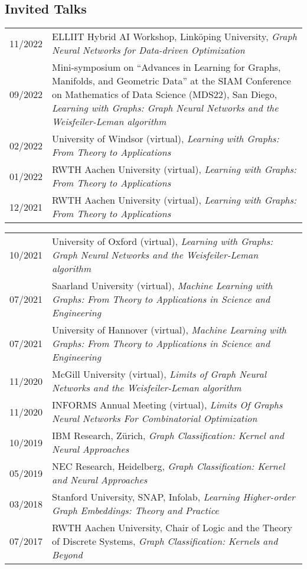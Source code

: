 \documentclass[11pt, a4paper, DIV=12]{scrartcl}
\begin{document}
\subsection*{Invited Talks}
\begin{tabular}{p{2.1cm}p{12.0cm}}
	
11/2022& ELLIIT Hybrid AI Workshop, Linköping University, \emph{Graph Neural Networks for Data-driven Optimization} \\
09/2022& Mini-symposium on ``Advances in Learning for Graphs, Manifolds, and Geometric Data'' at the SIAM Conference on Mathematics of Data Science (MDS22), San Diego, \emph{Learning with Graphs: Graph Neural Networks and the Weisfeiler-Leman algorithm}\\	
02/2022& University of Windsor (virtual), \emph{Learning with Graphs: From Theory to Applications}\\
01/2022&RWTH Aachen University (virtual), \emph{Learning with Graphs: From Theory to Applications}\\
12/2021&RWTH Aachen University (virtual), \emph{Learning with Graphs: From Theory to Applications}\\
\end{tabular}

\begin{tabular}{p{2.1cm}p{12.0cm}}
10/2021&University of Oxford (virtual), \emph{Learning with Graphs: Graph Neural Networks and the Weisfeiler-Leman algorithm}\\
07/2021&Saarland University (virtual), \emph{Machine Learning with Graphs:
	From Theory to Applications in Science and Engineering}\\
07/2021&University of Hannover (virtual), \emph{Machine Learning with Graphs:
	From Theory to Applications in Science and Engineering}\\
11/2020&McGill University (virtual), \emph{Limits of Graph Neural Networks and the Weisfeiler-Leman algorithm}\\
11/2020&INFORMS Annual Meeting (virtual), \emph{Limits Of Graphs Neural Networks For Combinatorial Optimization} \\
10/2019&IBM Research, Zürich, \emph{Graph Classification: Kernel and Neural Approaches}\\
05/2019&NEC Research, Heidelberg, \emph{Graph Classification: Kernel and Neural Approaches}\\ 
03/2018&Stanford University, SNAP, Infolab, \emph{Learning Higher-order Graph Embeddings: Theory and Practice}\\
07/2017&RWTH Aachen University, Chair of Logic and the Theory of Discrete Systems, \emph{Graph Classification: Kernels and Beyond}\\
\end{tabular}
\end{document}
